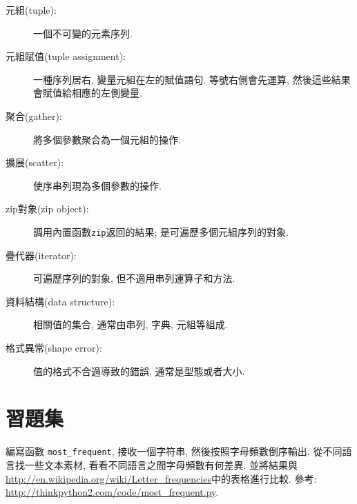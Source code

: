 \documentclass[10pt]{book}
\begin{document}
\begin{description}

\item[元組(tuple):] 一個不可變的元素序列. 

\item[元組賦值(tuple assignment):] 一種序列居右, 變量元組在左的賦值語句. 
等號右側會先運算, 然後這些結果會賦值給相應的左側變量. 

\item[聚合(gather):] 將多個參數聚合為一個元組的操作.

\item[擴展(scatter):] 使序串列現為多個參數的操作. 

\item[zip對象(zip object):] 調用內置函數{\tt zip}返回的結果;
是可遍歷多個元組序列的對象. 

\item[疊代器(iterator):] 可遍歷序列的對象, 但不適用串列運算子和方法. 

\item[資料結構(data structure):] 相關值的集合, 通常由串列, 字典, 元組等組成. 

\item[格式異常(shape error):] 值的格式不合適導致的錯誤, 通常是型態或者大小. 

\end{description}


\section{習題集}

\begin{exercise}

編寫函數 \verb"most_frequent", 接收一個字符串, 然後按照字母頻數倒序輸出. 
從不同語言找一些文本素材, 看看不同語言之間字母頻數有何差異. 
並將結果與\url{http://en.wikipedia.org/wiki/Letter_frequencies}中的表格進行比較. 
參考:
\url{http://thinkpython2.com/code/most_frequent.py}.  

\end{exercise}
\end{document}
